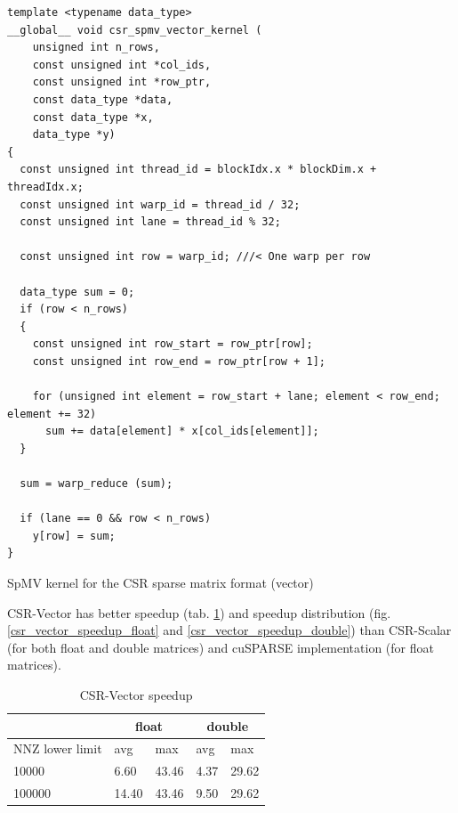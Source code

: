 \documentclass{article}
\begin{document}
\begin{listing}[H]
\begin{verbatim}
template <typename data_type>
__global__ void csr_spmv_vector_kernel (
    unsigned int n_rows,
    const unsigned int *col_ids,
    const unsigned int *row_ptr,
    const data_type *data,
    const data_type *x,
    data_type *y)
{
  const unsigned int thread_id = blockIdx.x * blockDim.x + threadIdx.x;
  const unsigned int warp_id = thread_id / 32;
  const unsigned int lane = thread_id % 32;

  const unsigned int row = warp_id; ///< One warp per row

  data_type sum = 0;
  if (row < n_rows)
  {
    const unsigned int row_start = row_ptr[row];
    const unsigned int row_end = row_ptr[row + 1];

    for (unsigned int element = row_start + lane; element < row_end; element += 32)
      sum += data[element] * x[col_ids[element]];
  }

  sum = warp_reduce (sum);

  if (lane == 0 && row < n_rows)
    y[row] = sum;
}
\end{verbatim}
\caption{SpMV kernel for the CSR sparse matrix format (vector)}
\label{csr_vector}
\end{listing}

CSR-Vector has better speedup (tab. \ref{csr_vector_speedup_table}) and speedup distribution (fig. \ref{csr_vector_speedup_float} and \ref{csr_vector_speedup_double}) 
than CSR-Scalar (for both float and double matrices) and cuSPARSE implementation (for float matrices). 

\begin{table}[H]
	\centering
	\begin{tabular}{ |p{2.6cm}||p{1cm}|p{1cm}|p{1cm}|p{1cm}|  }
	 \hline
		& \multicolumn{2}{|c|}{float} & \multicolumn{2}{|c|}{double}\\
	 \hline
	 NNZ lower limit & avg & max & avg & max  \\
	 \hline
	 10000  & 6.60  & 43.46 & 4.37 & 29.62 \\
	 100000 & 14.40 & 43.46 & 9.50 & 29.62 \\
	 \hline
	\end{tabular}
	\caption{CSR-Vector speedup}
  \label{csr_vector_speedup_table}
\end{table}
\end{document}
